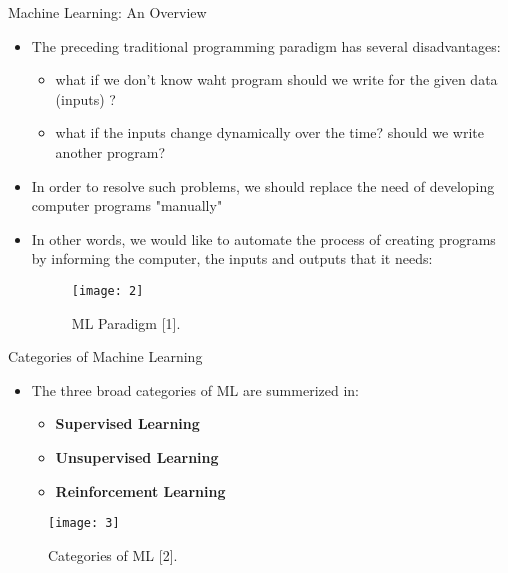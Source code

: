 \documentclass[compress,oilve]{beamer}
\begin{document}
\begin{frame}{Machine Learning: An Overview}
\begin{itemize}
\item The preceding traditional programming paradigm has several disadvantages:
	\begin{itemize}
	\item what if we don't know waht program should we write for the given data (inputs) ?
	\item what if the inputs change dynamically over the time? should we write another program? 
	\end{itemize}
\item In order to resolve such problems, we should replace the need of developing computer programs "manually"
\item In other words, we would like to automate the process of creating programs by informing the computer, the inputs and outputs that it needs:
\begin{center}
\begin{figure}
\texttt{[image: 2]}
\center \caption{ML Paradigm [1].}
\end{figure}
\end{center}
\end{itemize}
\end{frame}





\begin{frame}{Categories of Machine Learning}
\begin{itemize}
\item The three broad categories of ML are summerized in:
\begin{itemize}
\item \textbf{Supervised Learning}
\item \textbf{Unsupervised Learning}  
\item \textbf{Reinforcement Learning} 
\end{itemize}
\end{itemize}
\begin{figure}
\texttt{[image: 3]}
\caption{Categories of ML [2].}
\end{figure}
\end{frame}
\end{document}
